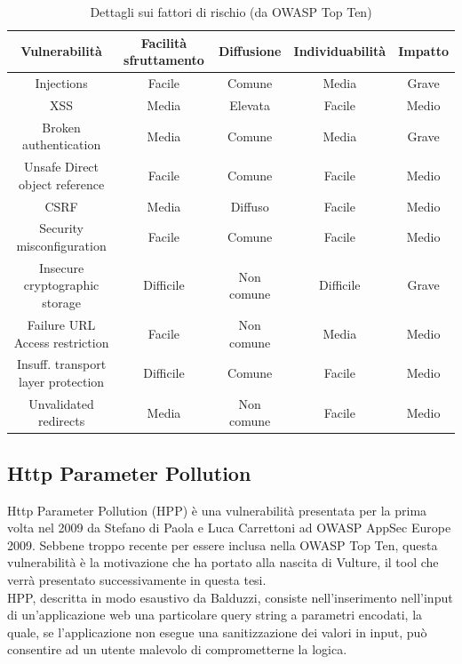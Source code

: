 \begin{itemize}
\begin{table}[!h]
\center
{\footnotesize
\begin{tabular}{|c|c|c|c|c|}
\hline
Vulnerabilità & Facilità sfruttamento & Diffusione & Individuabilità & Impatto\\
\hline
Injections & Facile & Comune & Media & Grave\\
XSS & Media & Elevata & Facile & Medio\\
Broken authentication & Media & Comune & Media & Grave\\
Unsafe Direct object reference & Facile & Comune & Facile & Medio\\
CSRF & Media & Diffuso & Facile & Medio\\
Security misconfiguration & Facile & Comune & Facile & Medio\\
Insecure cryptographic storage & Difficile & Non comune & Difficile & Grave\\
Failure URL Access restriction & Facile & Non comune & Media & Medio\\
Insuff. transport layer protection & Difficile & Comune & Facile & Medio\\
Unvalidated redirects & Media & Non comune & Facile & Medio\\
\hline
\end{tabular}}
\caption{Dettagli sui fattori di rischio (da OWASP Top Ten)}
\label{toptenrisk}
\end{table}
\end{itemize}

\subsection{Http Parameter Pollution}
Http Parameter Pollution (HPP) è una vulnerabilità presentata per la prima volta nel 2009 da Stefano di Paola e Luca Carrettoni\cite{dipaola} ad OWASP AppSec Europe 2009. Sebbene troppo recente per essere inclusa nella OWASP Top Ten, questa vulnerabilità è la motivazione che ha portato alla nascita di Vulture, il tool che verrà presentato successivamente in questa tesi.\\
HPP, descritta in modo esaustivo da Balduzzi\cite{hppbalduzzi}, consiste nell'inserimento nell'input di un'applicazione web una particolare query string a parametri encodati, la quale, se l'applicazione non esegue una sanitizzazione dei valori in input, può consentire ad un utente malevolo di comprometterne la logica.

